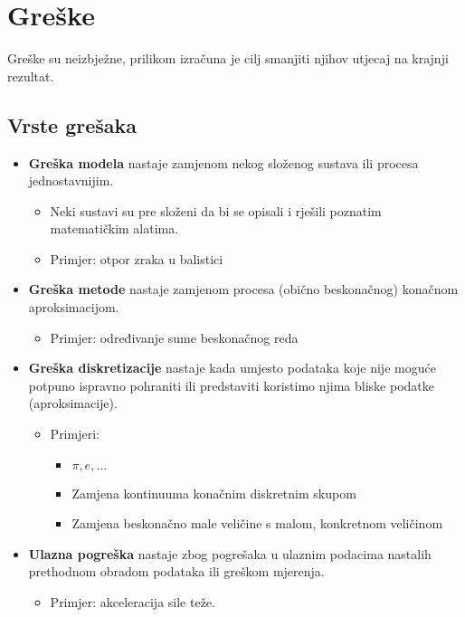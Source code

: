 \section{Greške}

Greške su neizbježne, prilikom izračuna je cilj smanjiti njihov utjecaj na krajnji rezultat.

\subsection{Vrste grešaka}

\begin{itemize}
    \item \textbf{Greška modela} nastaje zamjenom nekog složenog sustava ili procesa jednostavnijim.
    \begin{itemize}
        \item Neki sustavi su pre složeni da bi se opisali i rješili poznatim matematičkim alatima.
        \item Primjer: otpor zraka u balistici
    \end{itemize}
    \item \textbf{Greška metode} nastaje zamjenom procesa (obično beskonačnog) konačnom aproksimacijom.
    \begin{itemize}
        \item Primjer: određivanje sume beskonačnog reda
    \end{itemize}
    \item \textbf{Greška diskretizacije} nastaje kada umjesto podataka koje nije moguće potpuno ispravno pohraniti ili predstaviti koristimo njima bliske podatke (aproksimacije).
    \begin{itemize}
        \item Primjeri:
        \begin{itemize}
            \item $\pi, e, \dots$
            \item Zamjena kontinuuma konačnim diskretnim skupom
            \item Zamjena beskonačno male veličine s malom, konkretnom veličinom
        \end{itemize}
    \end{itemize}
    \item \textbf{Ulazna pogreška} nastaje zbog pogrešaka u ulaznim podacima nastalih prethodnom obradom podataka ili greškom mjerenja.
    \begin{itemize}
        \item Primjer: akceleracija sile teže.
    \end{itemize}
\end{itemize}

